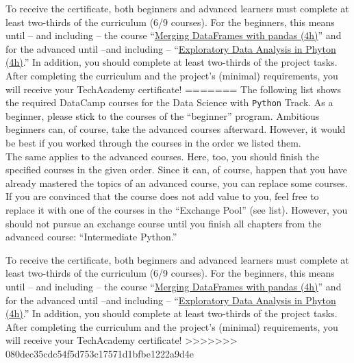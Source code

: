\documentclass[
  11pt,
]{article}
\begin{document}
To receive the certificate, both beginners and advanced learners must complete at least two-thirds of the curriculum (6/9 courses).
For the beginners, this means until -- and including -- the course ``\href{https://learn.datacamp.com/courses/merging-dataframes-with-pandas}{Merging DataFrames with pandas (4h)}'' and for the advanced until --and including -- ``\href{https://learn.datacamp.com/courses/exploratory-data-analysis-in-python}{Exploratory Data Analysis in Phyton (4h)}.'' In addition, you should complete at least two-thirds of the project tasks.
After completing the curriculum and the project's (minimal) requirements, you will receive your TechAcademy certificate!
=======
The following list shows the required DataCamp courses for the Data Science with \texttt{Python} Track. As a beginner, please stick to the courses of the ``beginner'' program. Ambitious beginners can, of course, take the advanced courses afterward. However, it would be best if you worked through the courses in the order we listed them.\\
The same applies to the advanced courses. Here, too, you should finish the specified courses in the given order. Since it can, of course, happen that you have already mastered the topics of an advanced course, you can replace some courses. If you are convinced that the course does not add value to you, feel free to replace it with one of the courses in the ``Exchange Pool'' (see list). However, you should not pursue an exchange course until you finish all chapters from the advanced course: ``Intermediate Python.''

To receive the certificate, both beginners and advanced learners must complete at least two-thirds of the curriculum (6/9 courses). For the beginners, this means until -- and including -- the course ``\href{https://learn.datacamp.com/courses/merging-dataframes-with-pandas}{Merging DataFrames with pandas (4h)}'' and for the advanced until --and including -- ``\href{https://learn.datacamp.com/courses/exploratory-data-analysis-in-python}{Exploratory Data Analysis in Phyton (4h)}.'' In addition, you should complete at least two-thirds of the project tasks. After completing the curriculum and the project's (minimal) requirements, you will receive your TechAcademy certificate!
>>>>>>> 080dec35cdc54f5d753c17571d1bfbe1222a9d4e
\end{document}
